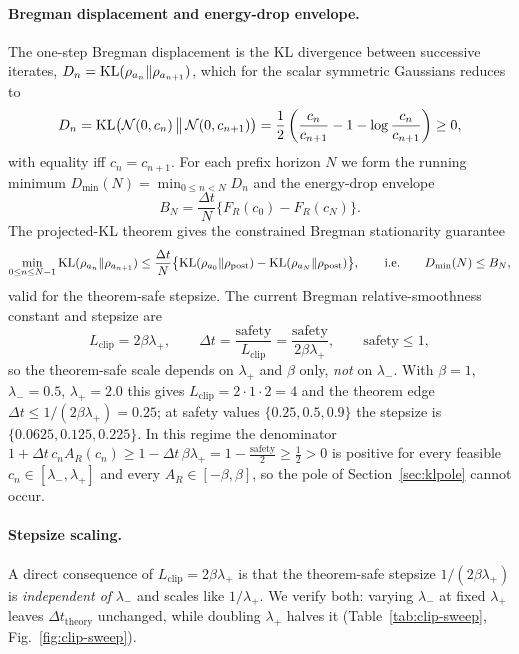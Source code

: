 \documentclass[11pt]{article}
\begin{document}
\paragraph{Bregman displacement and energy-drop envelope.}
The one-step Bregman displacement is the KL divergence between successive
iterates, $D_n=\mathrm{KL}(\rho_{a_n}\|\rho_{a_{n+1}})$, which for the scalar symmetric
Gaussians reduces to
\[
D_n=\mathrm{KL}\bigl(\mathcal{N}(0,c_n)\,\big\|\,\mathcal{N}(0,c_{n+1})\bigr)
=\frac12\left(\frac{c_n}{c_{n+1}}-1-\log\frac{c_n}{c_{n+1}}\right)\ge0,
\]
with equality iff $c_n=c_{n+1}$. For each prefix horizon $N$ we form the
running minimum $D_{\min}(N)=\min_{0\le n<N}D_n$ and the energy-drop envelope
\[
B_N=\frac{\Delta t}{N}\bigl\{F_R(c_0)-F_R(c_N)\bigr\}.
\]
The projected-KL theorem gives the constrained Bregman stationarity guarantee
\[
\min_{0\le n\le N-1}\mathrm{KL}(\rho_{a_n}\|\rho_{a_{n+1}})\le
\frac{\Delta t}{N}\bigl\{\mathrm{KL}(\rho_{a_0}\|\rho_{\mathrm{post}})-\mathrm{KL}(\rho_{a_N}\|\rho_{\mathrm{post}})\bigr\},
\qquad\text{i.e.}\qquad D_{\min}(N)\le B_N,
\]
valid for the theorem-safe stepsize. The current Bregman relative-smoothness
constant and stepsize are
\[
L_{\mathrm{clip}}=2\beta\lambda_+,
\qquad
\Delta t=\frac{\text{safety}}{L_{\mathrm{clip}}}=\frac{\text{safety}}{2\beta\lambda_+},
\qquad \text{safety}\le1 ,
\]
so the theorem-safe scale depends on $\lambda_+$ and $\beta$ only, \emph{not} on
$\lambda_-$. With $\beta=1$, $\lambda_-=0.5$, $\lambda_+=2.0$ this gives
$L_{\mathrm{clip}}=2\cdot1\cdot2=4$ and the theorem edge
$\Delta t\le 1/(2\beta\lambda_+)=0.25$; at safety values
$\{0.25,0.5,0.9\}$ the stepsize is $\{0.0625,0.125,0.225\}$. In this regime the
denominator $1+\Delta t\,c_nA_R(c_n)\ge 1-\Delta t\,\beta\lambda_+
=1-\tfrac{\text{safety}}{2}\ge\tfrac12>0$ is positive for every feasible
$c_n\in[\lambda_-,\lambda_+]$ and every $A_R\in[-\beta,\beta]$, so the pole of
Section~\ref{sec:klpole} cannot occur.

\paragraph{Stepsize scaling.}
A direct consequence of $L_{\mathrm{clip}}=2\beta\lambda_+$ is that the
theorem-safe stepsize $1/(2\beta\lambda_+)$ is \emph{independent of} $\lambda_-$
and scales like $1/\lambda_+$. We verify both: varying $\lambda_-$ at fixed
$\lambda_+$ leaves $\Delta t_{\mathrm{theory}}$ unchanged, while doubling
$\lambda_+$ halves it (Table~\ref{tab:clip-sweep}, Fig.~\ref{fig:clip-sweep}).
\end{document}
